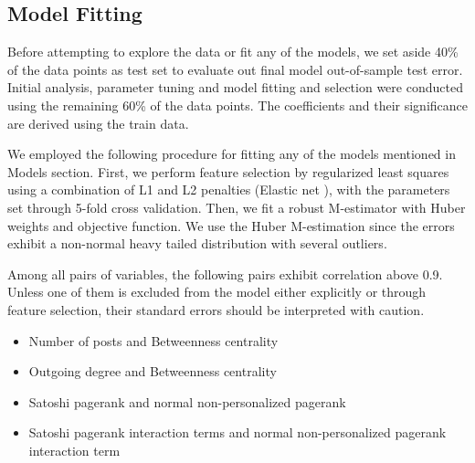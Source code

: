 \subsection{Model Fitting}
Before attempting to explore the data or fit any of the models, we set aside 40\% of the data points  as test set to evaluate out final model out-of-sample test error. Initial analysis, parameter tuning and model fitting and selection were conducted using the remaining 60\% of the data points. The coefficients and their significance are derived using the train data.

We employed the following procedure for fitting any of the models mentioned in Models section. First, we perform feature selection by regularized least squares using a combination of L1 and L2 penalties (Elastic net \cite{ElasticNet}), with the parameters set through 5-fold cross validation. Then, we fit a robust M-estimator with Huber weights and objective function. We use the Huber M-estimation since the errors exhibit a non-normal heavy tailed distribution with several outliers. 


Among all pairs of variables, the following pairs exhibit correlation above 0.9. Unless one of them is excluded from the model either explicitly or through feature selection, their standard errors should be interpreted with caution.
\begin{itemize} [topsep=0pt,itemsep=-0.5ex,partopsep=1ex,parsep=1ex]
 \item Number of posts and Betweenness centrality
 \item Outgoing degree and Betweenness centrality
 \item Satoshi pagerank and normal non-personalized pagerank
 \item Satoshi pagerank interaction terms and normal non-personalized pagerank interaction term
\end{itemize}





